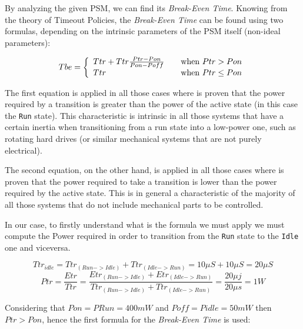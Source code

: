 \documentclass[a4paper]{article}
\begin{document}
            By analyzing the given PSM, we can find its \emph{Break-Even Time}. Knowing from the theory of Timeout Policies, the \emph{Break-Even Time} can be found using two formulas, depending on the intrinsic parameters of the PSM itself (non-ideal parameters):

            \begin{equation}
                Tbe = \left\{
                \begin{array}{l l}
                Ttr + Ttr \frac{Ptr - Pon}{Pon - Poff} & \quad \text{when $Ptr > Pon$}\\
                Ttr & \quad \text{when $Ptr \le Pon$}\\
                \end{array}
                \right.
            \end{equation}

            The first equation is applied in all those cases where is proven that the power required by a transition is greater than the power of the active state (in this case the \texttt{Run} state). This characteristic is intrinsic in all those systems that have a certain inertia when transitioning from a run state into a low-power one, such as rotating hard drives (or similar mechanical systems that are not purely electrical).

            The second equation, on the other hand, is applied in all those cases where is proven that the power required to take a transition is lower than the power required by the active state. This is in general a characteristic of the majority of all those systems that do not include mechanical parts to be controlled.

            In our case, to firstly understand what is the formula we must apply we must compute the Power required in order to transition from the \texttt{Run} state to the \texttt{Idle} one and viceversa.

            \begin{equation}
                Ttr_{idle} = Ttr_{(Run->Idle)} + Ttr_{(Idle->Run)} = 10 \mu S + 10 \mu S = 20 \mu S
            \end{equation}
            \begin{equation}
                Ptr = \frac{Etr}{Ttr} = \frac{Etr_{(Run->Idle)} + Etr_{(Idle->Run)}}{Ttr_{(Run->Idle)} + Ttr_{(Idle->Run)}} = \frac{20 \mu j}{20 \mu s} = 1W
            \end{equation}

            Considering that $Pon = PRun = 400mW$ and $Poff = Pidle = 50 mW$ then $Ptr > Pon$, hence the first formula for the \emph{Break-Even Time} is used:
\end{document}
